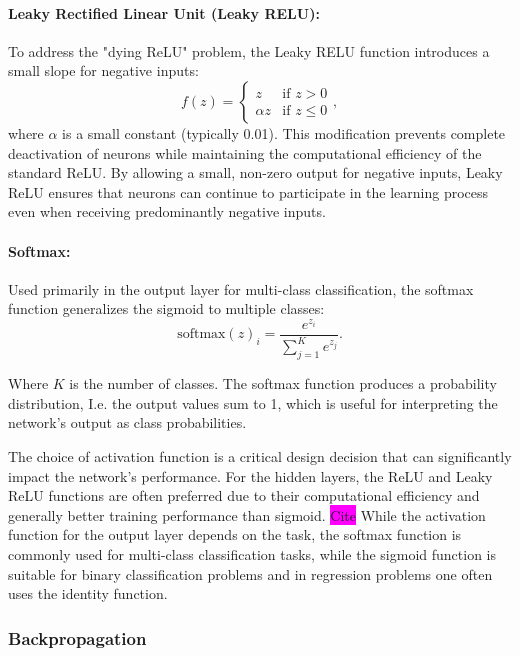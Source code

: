 \documentclass[aps,pra,english,notitlepage,reprint,nofootinbib]{revtex4-1}  %
\begin{document}
\paragraph*{Leaky Rectified Linear Unit (Leaky RELU):}
To address the "dying ReLU" problem, the Leaky RELU function introduces a small slope for negative inputs:
\begin{equation}
    f(z) =
    \begin{cases} z & \text{if } z > 0 \\
        \alpha z & \text{if } z \leq 0
    \end{cases},
\end{equation}
where \( \alpha \) is a small constant (typically 0.01). This modification prevents complete deactivation of neurons while maintaining the computational efficiency of the standard ReLU. By allowing a small, non-zero output for negative inputs, Leaky ReLU ensures that neurons can continue to participate in the learning process even when receiving predominantly negative inputs.

\paragraph*{Softmax:}
Used primarily in the output layer for multi-class classification, the softmax function generalizes the sigmoid to multiple classes:
\begin{equation}
    \text{softmax}(z)_i = \frac{e^{z_i}}{\sum_{j=1}^{K} e^{z_j}}.
\end{equation}

Where \( K \) is the number of classes. The softmax function produces a probability distribution, I.e. the output values sum to 1, which is useful for interpreting the network's output as class probabilities.

The choice of activation function is a critical design decision that can significantly impact the network's performance. For the hidden layers, the ReLU and Leaky ReLU functions are often preferred due to their computational efficiency and generally better training performance than sigmoid. \colorbox{magenta}{Cite} While the activation function for the output layer depends on the task, the softmax function is commonly used for multi-class classification tasks, while the sigmoid function is suitable for binary classification problems and in regression problems one often uses the identity function.

\subsubsection{Backpropagation}
\end{document}
